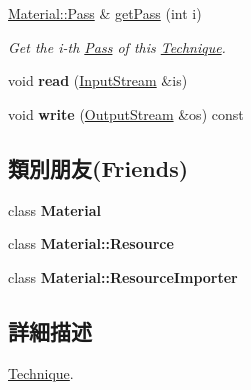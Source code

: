\begin{DoxyCompactItemize}
\hyperlink{class_i_dream_sky_1_1_material_1_1_pass}{Material\+::\+Pass} \& \hyperlink{class_i_dream_sky_1_1_material_1_1_technique_a99d7ec03f793832c402a65f11803814a}{get\+Pass} (int i)
\begin{DoxyCompactList}\small\item\em Get the i-\/th \hyperlink{class_i_dream_sky_1_1_material_1_1_pass}{Pass} of this \hyperlink{class_i_dream_sky_1_1_material_1_1_technique}{Technique}. \end{DoxyCompactList}\item 
void {\bfseries read} (\hyperlink{class_i_dream_sky_1_1_input_stream}{Input\+Stream} \&is)\hypertarget{class_i_dream_sky_1_1_material_1_1_technique_a9e226e1b8d586e9a1164f82a5fbb9f66}{}\label{class_i_dream_sky_1_1_material_1_1_technique_a9e226e1b8d586e9a1164f82a5fbb9f66}

\item 
void {\bfseries write} (\hyperlink{class_i_dream_sky_1_1_output_stream}{Output\+Stream} \&os) const \hypertarget{class_i_dream_sky_1_1_material_1_1_technique_a1881316367bc8086d4d58e0a8b34e42b}{}\label{class_i_dream_sky_1_1_material_1_1_technique_a1881316367bc8086d4d58e0a8b34e42b}

\end{DoxyCompactItemize}
\subsection*{類別朋友(Friends)}
\begin{DoxyCompactItemize}
\item 
class {\bfseries Material}\hypertarget{class_i_dream_sky_1_1_material_1_1_technique_aa1212b6e372a0f45d2c01f3cd203af77}{}\label{class_i_dream_sky_1_1_material_1_1_technique_aa1212b6e372a0f45d2c01f3cd203af77}

\item 
class {\bfseries Material\+::\+Resource}\hypertarget{class_i_dream_sky_1_1_material_1_1_technique_a6a002bcee6c883089769545352e9ccbd}{}\label{class_i_dream_sky_1_1_material_1_1_technique_a6a002bcee6c883089769545352e9ccbd}

\item 
class {\bfseries Material\+::\+Resource\+Importer}\hypertarget{class_i_dream_sky_1_1_material_1_1_technique_a941a71e735085112a8496c27836506ee}{}\label{class_i_dream_sky_1_1_material_1_1_technique_a941a71e735085112a8496c27836506ee}

\end{DoxyCompactItemize}


\subsection{詳細描述}
\hyperlink{class_i_dream_sky_1_1_material_1_1_technique}{Technique}. 

